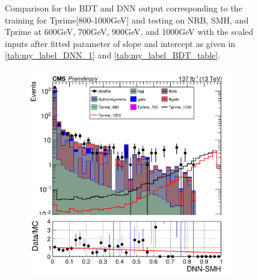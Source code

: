 \begin{figure}[H]
\begin{subfigure}[b]{0.47\textwidth}
         \label{fig:three sin x}
     \end{subfigure}
    \hfill
     \label{fig:}
     \caption{Comparison for the BDT and DNN output corresponding to the training for Tprime[800-1000GeV] and testing on NRB, SMH, and Tprime at 600GeV, 700GeV, 900GeV, and 1000GeV with the scaled inputs after fitted parameter of slope and intercept as given in \autoref{tab:my_label_DNN_1} and \autoref{tab:my_label_BDT_table}.}
\end{figure}



\begin{figure}[H]
     \centering
     \begin{subfigure}[b]{0.47\textwidth}
         \centering
         \includegraphics[width=\textwidth]{figure_4/Stacked_plot_DNN_1100-1200_with_diphoton_cuts_scaled_inputs.pdf}
         \label{fig:y equals x}
     \end{subfigure}
     \hfill
     \begin{subfigure}[b]{0.47\textwidth}
         \centering

\end{subfigure}
\end{figure}
